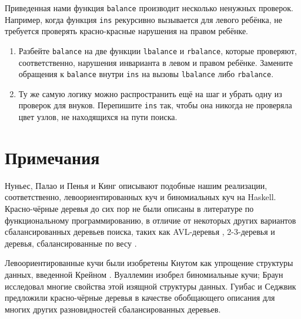 \begin{exercise}\label{ex:3.10}
  Приведенная нами функция \lstinline!balance! производит несколько
  ненужных проверок. Например, когда функция \lstinline!ins!
  рекурсивно вызывается для левого ребёнка, не требуется проверять
  красно-красные нарушения на правом ребёнке.
  \begin{enumerate}
  \item Разбейте \lstinline!balance! на две функции
    \lstinline!lbalance! и \lstinline!rbalance!, которые проверяют,
    соответственно, нарушения инварианта в левом и правом
    ребёнке. Замените обращения к \lstinline!balance! внутри
    \lstinline!ins! на вызовы \lstinline!lbalance! либо \lstinline!rbalance!.
  \item Ту же самую логику можно распространить ещё на шаг и убрать
    одну из проверок для внуков. Перепишите \lstinline!ins! так, чтобы
    она никогда не проверяла цвет узлов, не находящихся на пути поиска.
  \end{enumerate}
\end{exercise}

\section{Примечания}
\label{sc:3.4}

Нуньес, Палао и Пенья \cite{NunezPalaoPena1995} и Кинг \cite{King1994}
описывают подобные нашим реализации, соответственно,
левоориентированных куч и биномиальных куч на Haskell.  Красно-чёрные
деревья до сих пор не были описаны в литературе по функциональному
программированию, в отличие от некоторых других вариантов
сбалансированных деревьев поиска, таких как AVL-деревья
\cite{Myers1982, Myers1984, BirdWadler1988, NunezPalaoPena1995},
2-3-деревья \cite{Reade1992} и деревья, сбалансированные по весу
\cite{Adams1993}.

Левоориентированные кучи были изобретены Кнутом \cite{Knuth1973a} как
упрощение структуры данных, введенной Крейном
\cite{Crane1972}. Вуаллемин \cite{Vuillemin1978} изобрел биномиальные
кучи; Браун \cite{Brown1978} исследовал многие свойства этой изящной
структуры данных. Гуибас и Седжвик \cite{GuibasSedgewick1978}
предложили красно-чёрные деревья в качестве обобщающего описания для
многих других разновидностей сбалансированных деревьев.

